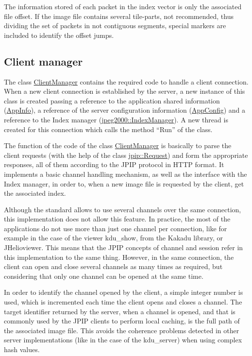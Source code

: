 The information stored of each packet in the index vector 
is only the associated file offset. If the image file contains several tile-parts, 
not recommended, thus dividing the set of packets in not contiguous segments, 
special markers are included to identify the offset jumps.


\subsection{Client manager}

The class \hyperlink{classClientManager}{ClientManager} contains the required
code to handle a client connection. When a new client connection is established
by the server, a new instance of this class is created passing a reference
to the application shared information (\hyperlink{classAppInfo}{AppInfo}), a
reference of the server configuration information (\hyperlink{classAppConfig}
{AppConfig}) and a reference to the Index manager (\hyperlink{classjpeg2000_1_1IndexManager}
{jpeg2000::IndexManager}). A new
thread is created for this connection which calls the method ``Run''
of the class.

The function of the code of the class \hyperlink{classClientManager}{ClientManager} 
is basically to parse the client requests (with the help of the class
\hyperlink{classjpip_1_1Request}{jpip::Request}) and form the appropriate responses,
all of them according to the JPIP protocol in HTTP format. It implements a basic
channel handling mechanism, as well as the interface with the Index manager, in
order to, when a new image file is requested by the client, get the associated
index.

Although the standard allows to use several channels over the same connection,
this implementation does not allow this feature. In practice, the most of the
applications do not use more than just one channel per connection, like for example
in the case of the viewer kdu\_show, from the Kakadu library, or JHelioviewer. This
means that the JPIP concepts of channel and session refer in this implementation
to the same thing. However, in the same connection, the client can open and
close several channels as many times as required, but considering that only
one channel can be opened at the same time.

In order to identify the channel opened by the client, a simple integer number
is used, which is incremented each time the client opens and closes a channel.
The target identifier returned by the server, when a channel is opened, and 
that is commonly used by the JPIP clients to perform local caching, is the
full path of the associated image file. This avoids the coherence problems
detected in other server implementations (like in the case of the kdu\_server)
when using complex hash values.

